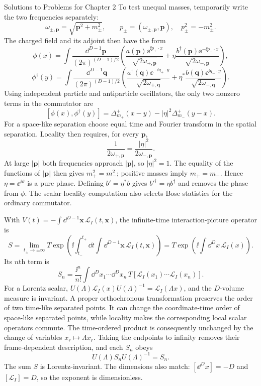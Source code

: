 \begin{bankssolutions}{Solutions to Problems for Chapter 2}
To test unequal masses, temporarily write the two frequencies separately:
\[
  \omega_{\pm,\mathbf p}=\sqrt{\mathbf p^{2}+m_{\pm}^{2}},
  \qquad p_{\pm}=(\omega_{\pm,\mathbf p},\mathbf p),\quad p_{\pm}^{2}=-m_{\pm}^{2}.
\]
The charged field and its adjoint then have the form
\[
  \phi(x)=\int\frac{\dd^{D-1}\mathbf p}{(2\pi)^{(D-1)/2}}
  \left(\frac{a(\mathbf p)\ee^{\ii p_{+}\mathbin{\cdot}x}}{\sqrt{2\omega_{+,\mathbf p}}}
  +\eta\frac{b^{\dagger}(\mathbf p)\ee^{-\ii p_{-}\mathbin{\cdot}x}}{\sqrt{2\omega_{-,\mathbf p}}}\right),
\]
\[
  \phi^{\dagger}(y)=\int\frac{\dd^{D-1}\mathbf q}{(2\pi)^{(D-1)/2}}
  \left(\frac{a^{\dagger}(\mathbf q)\ee^{-\ii q_{+}\mathbin{\cdot}y}}{\sqrt{2\omega_{+,\mathbf q}}}
  +\eta^{*}\frac{b(\mathbf q)\ee^{\ii q_{-}\mathbin{\cdot}y}}{\sqrt{2\omega_{-,\mathbf q}}}\right).
\]
Using independent particle and antiparticle oscillators, the only two nonzero terms in the commutator are
\[
  [\phi(x),\phi^{\dagger}(y)]
  =\Delta^{+}_{m_{+}}(x-y)-|\eta|^{2}\Delta^{+}_{m_{-}}(y-x).
\]
For a space-like separation choose equal time and Fourier transform in the spatial separation. Locality then requires, for every $\mathbf p$,
\[
  \frac{1}{2\omega_{+,\mathbf p}}
  =\frac{|\eta|^{2}}{2\omega_{-,\mathbf p}}.
\]
At large $|\mathbf p|$ both frequencies approach $|\mathbf p|$, so $|\eta|^{2}=1$. The equality of the functions of $|\mathbf p|$ then gives $m_{+}^{2}=m_{-}^{2}$; positive masses imply $m_{+}=m_{-}$. Hence $\eta=\ee^{\ii\vartheta}$ is a pure phase. Defining $b'=\eta^{*}b$ gives $b'^{\dagger}=\eta b^{\dagger}$ and removes the phase from $\phi$. The scalar locality computation also selects Bose statistics for the ordinary commutator.

With $V(t)=-\int\dd^{D-1}\mathbf x\,\mathcal L_{I}(t,\mathbf x)$, the infinite-time interaction-picture operator is
\[
  S=\lim_{t_{\pm}\to\pm\infty}
  T\exp\!\left(\ii\int_{t_{-}}^{t_{+}}\dd t\int\dd^{D-1}\mathbf x\,\mathcal L_{I}(t,\mathbf x)\right)
  =T\exp\!\left(\ii\int\dd^{D}x\,\mathcal L_{I}(x)\right).
\]
Its $n$th term is
\[
  S_{n}=\frac{\ii^{n}}{n!}\int\dd^{D}x_{1}\cdots\dd^{D}x_{n}\,
  T\!\left[\mathcal L_{I}(x_{1})\cdots\mathcal L_{I}(x_{n})\right].
\]
For a Lorentz scalar, $U(\Lambda)\mathcal L_{I}(x)U(\Lambda)^{-1}=\mathcal L_{I}(\Lambda x)$, and the $D$-volume measure is invariant. A proper orthochronous transformation preserves the order of two time-like separated points. It can change the coordinate-time order of space-like separated points, while locality makes the corresponding local scalar operators commute. The time-ordered product is consequently unchanged by the change of variables $x_{r}\mapsto\Lambda x_{r}$. Taking the endpoints to infinity removes their frame-dependent description, and each $S_{n}$ obeys
\[
  U(\Lambda)S_{n}U(\Lambda)^{-1}=S_{n}.
\]
The sum $S$ is Lorentz-invariant. The dimensions also match: $[\dd^{D}x]=-D$ and $[\mathcal L_{I}]=D$, so the exponent is dimensionless.


\end{bankssolutions}

